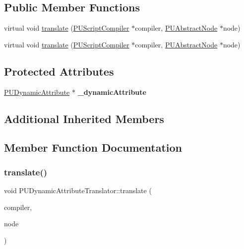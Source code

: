 \subsection*{Public Member Functions}
\begin{DoxyCompactItemize}
\item 
virtual void \hyperlink{classPUDynamicAttributeTranslator_a6193eb5c643b917896904da8442a4815}{translate} (\hyperlink{classPUScriptCompiler}{P\+U\+Script\+Compiler} $\ast$compiler, \hyperlink{classPUAbstractNode}{P\+U\+Abstract\+Node} $\ast$node)
\item 
virtual void \hyperlink{classPUDynamicAttributeTranslator_abb0555d08c17bfd5fbd10584d7851d1b}{translate} (\hyperlink{classPUScriptCompiler}{P\+U\+Script\+Compiler} $\ast$compiler, \hyperlink{classPUAbstractNode}{P\+U\+Abstract\+Node} $\ast$node)
\end{DoxyCompactItemize}
\subsection*{Protected Attributes}
\begin{DoxyCompactItemize}
\item 
\mbox{\label{classPUDynamicAttributeTranslator_a1dbabcac35c44bb9e601251aa9a50e04}} 
\hyperlink{classPUDynamicAttribute}{P\+U\+Dynamic\+Attribute} $\ast$ {\bfseries \+\_\+dynamic\+Attribute}
\end{DoxyCompactItemize}
\subsection*{Additional Inherited Members}


\subsection{Member Function Documentation}
\mbox{\label{classPUDynamicAttributeTranslator_a6193eb5c643b917896904da8442a4815}} 
\subsubsection{\texorpdfstring{translate()}{translate()}\hspace{0.1cm}{\footnotesize\ttfamily [1/2]}}
{\footnotesize\ttfamily void P\+U\+Dynamic\+Attribute\+Translator\+::translate (\begin{DoxyParamCaption}\item[{\hyperlink{classPUScriptCompiler}{P\+U\+Script\+Compiler} $\ast$}]{compiler,  }\item[{\hyperlink{classPUAbstractNode}{P\+U\+Abstract\+Node} $\ast$}]{node }\end{DoxyParamCaption})\hspace{0.3cm}{\ttfamily [virtual]}}

